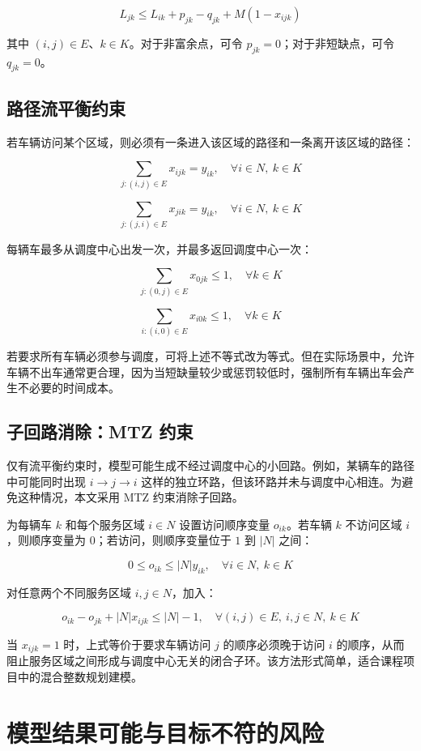 \documentclass[UTF8,a4paper,12pt]{ctexart}
\begin{document}
\[
L_{jk}\le L_{ik}+p_{jk}-q_{jk}+M(1-x_{ijk})
\]

其中 \((i,j)\in E\)、\(k\in K\)。对于非富余点，可令 \(p_{jk}=0\)；对于非短缺点，可令 \(q_{jk}=0\)。

\subsection{路径流平衡约束}

若车辆访问某个区域，则必须有一条进入该区域的路径和一条离开该区域的路径：

\[
\sum_{j:(i,j)\in E}x_{ijk}=y_{ik},
\quad \forall i\in N,\ k\in K
\]

\[
\sum_{j:(j,i)\in E}x_{jik}=y_{ik},
\quad \forall i\in N,\ k\in K
\]

每辆车最多从调度中心出发一次，并最多返回调度中心一次：

\[
\sum_{j:(0,j)\in E}x_{0jk}\le 1,\quad \forall k\in K
\]

\[
\sum_{i:(i,0)\in E}x_{i0k}\le 1,\quad \forall k\in K
\]

若要求所有车辆必须参与调度，可将上述不等式改为等式。但在实际场景中，允许车辆不出车通常更合理，因为当短缺量较少或惩罚较低时，强制所有车辆出车会产生不必要的时间成本。

\subsection{子回路消除：MTZ 约束}

仅有流平衡约束时，模型可能生成不经过调度中心的小回路。例如，某辆车的路径中可能同时出现 \(i\to j\to i\) 这样的独立环路，但该环路并未与调度中心相连。为避免这种情况，本文采用 MTZ 约束消除子回路。

为每辆车 \(k\) 和每个服务区域 \(i\in N\) 设置访问顺序变量 \(o_{ik}\)。若车辆 \(k\) 不访问区域 \(i\)，则顺序变量为 0；若访问，则顺序变量位于 \(1\) 到 \(|N|\) 之间：

\[
0\le o_{ik}\le |N|y_{ik},\quad \forall i\in N,\ k\in K
\]

对任意两个不同服务区域 \(i,j\in N\)，加入：

\[
o_{ik}-o_{jk}+|N|x_{ijk}\le |N|-1,
\quad \forall (i,j)\in E,\ i,j\in N,\ k\in K
\]

当 \(x_{ijk}=1\) 时，上式等价于要求车辆访问 \(j\) 的顺序必须晚于访问 \(i\) 的顺序，从而阻止服务区域之间形成与调度中心无关的闭合子环。该方法形式简单，适合课程项目中的混合整数规划建模。

\section{模型结果可能与目标不符的风险}
\end{document}
